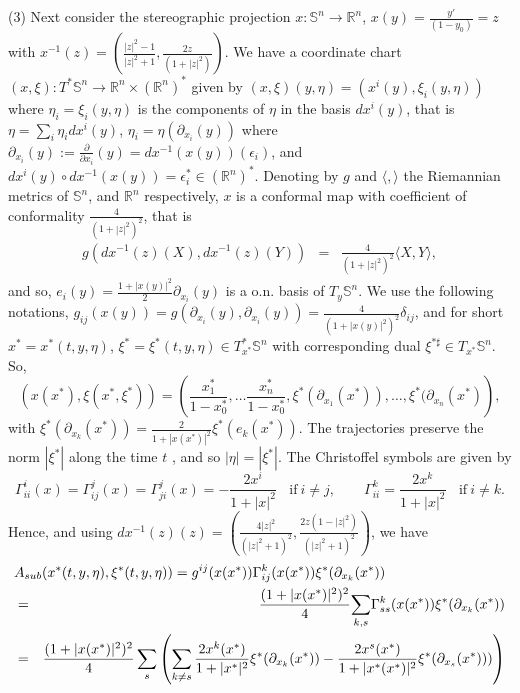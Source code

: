\documentclass[11pt,a4paper,times]{amsart}
\theoremstyle{plain}
\theoremstyle{definition}
\numberwithin{equation}{section}
\newcommand{\R}{\mathbb{R}}
\newcommand{\Se}{\mathbb{S}}
\begin{document}
{\noindent
(3) Next consider the stereographic projection
$x: \Se^n\to \mathbb{R}^n$, $x(y)= \frac{y'}{(1-y_0)}=z$ with $x^{-1}(z)=\left(\frac{|z|^2-1}{|z|^2+1}, \frac{2z}{(1+|z|^2)}\right)$.  We have a coordinate chart  $(x,\xi):T^*\Se^n\to \R^n\times (\R^n)^*$ given by $(x,\xi)(y,\eta)=(x^i(y), \xi_i(y,\eta))$ where $\eta_i=\xi_i(y,\eta)$ is the components of $\eta$ in the basis $dx^i(y)$, that is $\eta=\sum_i\eta_idx^i(y)$, 
$\eta_i=\eta\left(\partial_{x_i}(y)\right)$ where $\partial_{x_i}(y):=\frac{\partial}{\partial x_i}(y)= dx^{-1}(x(y))(\epsilon_i)$, and $dx^i(y)\circ dx^{-1}(x(y))=\epsilon_i^*\in (\mathbb{R}^n)^*$. 
Denoting by  $g$ and $\langle, \rangle$  the Riemannian metrics of $\Se^n$, and $\R^n$ respectively,   $x$ is a conformal map  with coefficient of conformality $ \frac{4}{(1+|z|^2)^2}$, that is
\begin{eqnarray*}
g(dx^{-1}(z)(X), dx^{-1}(z)(Y)) &=&\frac{4}{(1+|z|^2)^2}\langle X,Y\rangle,
\end{eqnarray*}
and so, $e_i(y)=\frac{1+|x(y)|^2}{2}\partial_{x_i}(y)$ is a o.n. basis of $T_{y}\Se^n$. We use the following notations,   $g_{ij}(x(y))=g\left( \partial_{x_i}(y),  \partial_{x_i}(y)\right)=\frac{4}{(1+ |x(y)|^2)^2}\delta_{ij}$, 
and for  short $x^*=x^*(t,y,\eta)$,
{$\xi^*=\xi^*(t,y,\eta)\in T^*_{x^*}\mathbb{S}^n$ with corresponding dual
$\xi^{*\sharp}\in T_{x^*}\mathbb{S}^n$}. So,  
\[(x(x^*), \xi(x^*, \xi^*))=\left(\frac{ x_1^*}{1-x^*_0}, \ldots \frac{x_n^*}{1-x^*_0}, \xi^*(\partial_{x_1}(x^*)), \ldots, \xi^*(\partial_{x_n}(x^*)\right),\]
with $\xi^*\left(\partial_{x_k}(x^*)\right)=\frac{2}{1+|x(x^*)|^2}\xi^*(e_k(x^*))$. 
The trajectories preserve the  norm $|\xi^*|$ along the time  $t$ , and so $|\eta|=|\xi^*|$. 
 The Christoffel symbols are given by
\[\Gamma^i_{ii}(x)=\Gamma^j_{ij}(x)=\Gamma^j_{ji}(x)= -\frac{2 x^i}{1+|x|^2}~\mbox{~~if}~i\neq j, \quad\quad \Gamma^k_{ii}=\frac{2 x^k}{1+|x|^2}~\mbox{~~if}~i\neq k.\]
Hence, and using 
$dx^{-1}(z)(z) = \left(\frac{4|z|^2}{(|z|^2+1)^2}, \frac{ 2z(1-|z|^2)}{(|z|^2+1)^2}\right)$, we have 
\begin{eqnarray*}
\lefteqn{A_{sub}(x^*(t,y,\eta), \xi^*(t,y,\eta)) = g^{ij}(x(x^*))\Gamma^{k}_{ij}(x(x^*)) \xi^*(\partial_{x_k}(x^*))}\\
& =& \frac{(1+|x(x^*)|^2)^2}{4}{\sum_{k,s}} \Gamma^k_{ss}(x(x^*))\xi^*(\partial_{x_k}(x^*))\\
& =&  \frac{(1+|x(x^*)|^2)^2}{4}\sum_s\left(\sum_{k\neq s} \frac{2 x^k(x^*)}{1+|x^*|^2}\xi^*(\partial_{x_k}(x^*))-\frac{2 x^s(x^*)}{1+|x^*(x^*)|^2}\xi^*(\partial_{x_s}(x^*)))\right)\\

\end{eqnarray*}}
\end{document}
